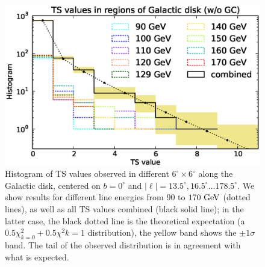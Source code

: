 \documentclass[aps,twocolumn,prd,superscriptaddress,showpacs,nofootinbib,fixfloat]{revtex4}
\newcommand{\GeV}{{\rm ~GeV}}
\begin{document}
\begin{figure}
  \begin{center}
    \includegraphics[width=1.0\linewidth]{plots/hotspot_histogram.eps}
  \end{center}
  \caption{Histogram of TS values observed in different
  $6^\circ\times6^\circ$ along the Galactic disk, centered on $b=0^\circ$ and
  $|\ell|=13.5^\circ, 16.5^\circ \dots 178.5^\circ$. We show results for
  different line energies from 90 to $170\GeV$ (dotted lines), as well as all
  TS values combined (black solid line); in the latter case, the black dotted
  line is the theoretical expectation (a $0.5\chi^2_{k=0}+0.5\chi^2{k=1}$
  distribution), the yellow band shows the $\pm1\sigma$ band. The tail of the
  observed distribution is in agreement with what is expected.}
  \label{fig:hotspots}
\end{figure}
\end{document}
